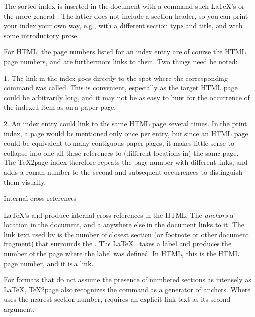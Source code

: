 The sorted index is inserted in the document with a
command such \LaTeX's \p{\printindex} or the more
general .  The latter does not include a
section header, so you can print your index your own
way, e.g., with a different section type and title, and
with some introductory prose.

For HTML, the page numbers listed for an index entry are
of course the HTML page numbers, and are furthermore
links to them.  Two things need be noted:

\item{1.}  The link in the index goes directly to the spot where
the corresponding \p{\index} command was called.  This
is convenient, especially as the target HTML page could
be arbitrarily long, and it may not be as easy to hunt
for the occurrence of the indexed item as on a paper
page.

\item{2.} An index entry could link to the same HTML page
several times.  In the print index, a page would be mentioned
only once per entry, but since an HTML page could
be equivalent to many contiguous paper pages, it makes
little sense to collapse into one all these references to
(different locations in) the same page.  The \TeX2page
index therefore repeats the page number with different
links, and adds a roman number to the second and
subsequent occurrences to distinguish them visually.

\beginsection Internal cross-references

LaTeX's \p{\label} and \p{\ref} produce internal
cross-references in the HTML.  The \p{\label} {\em anchors}
a location in the document, and a \p{\ref} anywhere
else in the document links to it.  The link text used
by \p{\ref} is the number of closest section (or footnote or other
document fragment) that surrounds the \p{\label}.
The \LaTeX\ \p{\pageref} takes a label and produces the
number of the page where the label was defined.  In
HTML, this is the HTML page number, and it is a link.

For formats that do not assume the presence of numbered
sections as intensely as \LaTeX, \TeX2page also recognizes the \p{\xrtag}
command as a generator of anchors.  Where \p{\label}
uses the nearest section number, \p{\xrtag} requires
an explicit link text as its second argument.

